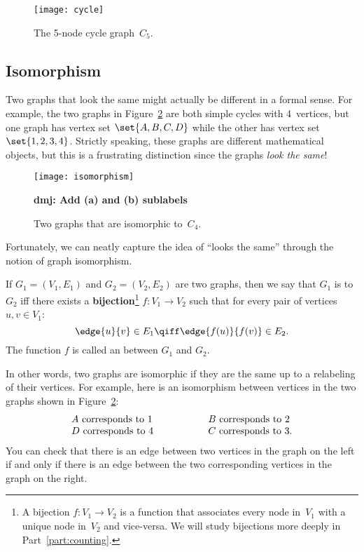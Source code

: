\begin{figure}[h]
\texttt{[image: cycle]}
\caption{The 5-node cycle graph~$C_5$.}
\label{fig:graph_C_5}
\end{figure}

\subsection{Isomorphism}

Two graphs that look the same might actually be different in a formal
sense.  For example, the two graphs in Figure~\ref{fig:isomorphism}
are both simple cycles with 4~vertices, but one graph has vertex set
$\set{A, B, C, D}$ while the other has vertex set $\set{1, 2, 3, 4}$.
Strictly speaking, these graphs are different mathematical objects,
but this is a frustrating distinction since the graphs \emph{look the
same}!

\begin{figure}
\texttt{[image: isomorphism]}

\textbf{dmj: Add (a) and (b) sublabels}

\caption{Two graphs that are isomorphic to~$C_4$.}
\label{fig:isomorphism}
\end{figure}

Fortunately, we can neatly capture the idea of ``looks the same''
through the notion of graph isomorphism.

\begin{definition}\label{simple-isomorphism}
If $G_1 = (V_1, E_1)$ and $G_2 = (V_2, E_2)$ are two graphs, then we
say that $G_1$ is  to $G_2$ iff there exists a
\textbf{bijection}\footnote{A bijection $f: V_1 \to V_2$ is a function
  that associates every node in~$V_1$ with a unique node in~$V_2$ and
  vice-versa.  We will study bijections more deeply in
  Part~\ref{part:counting}.} $f: V_1 \to V_2$ such that for every pair
of vertices $u, v \in V_1$:
\[
\edge{u}{v} \in E_1 \qiff \edge{f(u)}{f(v)} \in E_2.
\]
The function $f$ is called an  between $G_1$ and $G_2$.
\end{definition}

In other words, two graphs are isomorphic if they are the same up to a
relabeling of their vertices.
For example, here is an isomorphism between vertices in the two graphs
shown in Figure~\ref{fig:isomorphism}:
\[
\begin{array}{lll}
A \text{ corresponds to } 1 & \hspace{0.5in} & B \text{ corresponds to } 2 \\
D \text{ corresponds to } 4 & & C \text{ corresponds to } 3.
\end{array}
\]
You can check that there is an edge between two vertices in the graph
on the left if and only if there is an edge between the two
corresponding vertices in the graph on the right.

